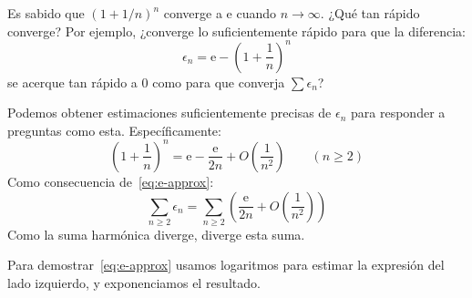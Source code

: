   Es sabido que \((1 + 1/n)^n\) converge a \(\mathrm{e}\)
  cuando \(n \to \infty\).
  ¿Qué tan rápido converge?
  Por ejemplo,
  ¿converge lo suficientemente rápido para que la diferencia:
  \begin{equation*}
    \epsilon_n
      = \mathrm{e} - \left( 1 + \frac{1}{n} \right)^n
  \end{equation*}
  se acerque tan rápido a \num{0}
  como para que converja \(\sum \epsilon_n\)?

  Podemos obtener estimaciones suficientemente precisas de \(\epsilon_n\)
  para responder a preguntas como esta.
  Específicamente:
  \begin{equation}
    \label{eq:e-approx}
    \left( 1 + \frac{1}{n} \right)^n
      = \mathrm{e} - \frac{\mathrm{e}}{2 n} + O\left( \frac{1}{n^2} \right)
      \qquad (n \ge 2)
  \end{equation}
  Como consecuencia de~\eqref{eq:e-approx}:
  \begin{equation*}
    \sum_{n \ge 2} \epsilon_n
      = \sum_{n \ge 2}
          \left(
            \frac{\mathrm{e}}{2 n} + O\left( \frac{1}{n^2} \right)
          \right)
  \end{equation*}
  Como la suma harmónica diverge,
  diverge esta suma.

  Para demostrar~\eqref{eq:e-approx}
  usamos logaritmos para estimar la expresión del lado izquierdo,
  y exponenciamos el resultado.

